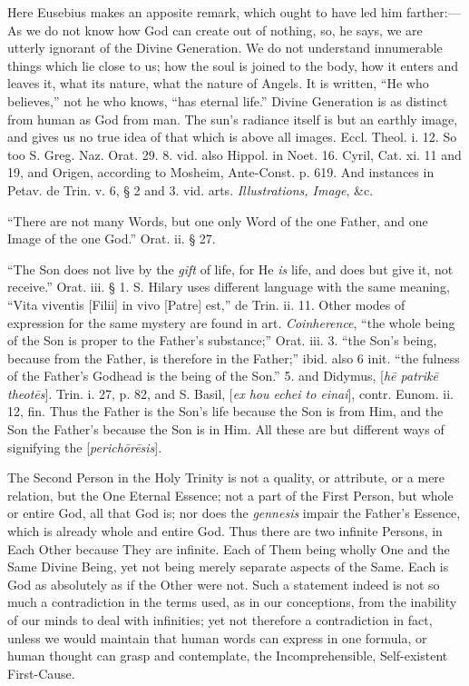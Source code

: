 Here Eusebius makes an apposite remark, which
ought to have led him farther:—As we do not know how God can create
out of nothing, so, he says, we are utterly ignorant of the Divine
Generation. We do not understand innumerable things which lie close to
us; how the soul is joined to the body, how it enters and leaves it,
what its nature, what the nature of Angels. It is written, ``He who
believes,'' not he who knows, ``has eternal life.'' Divine Generation is
as distinct from human as God from man. The sun's radiance itself is
but an earthly image, and gives us no true idea of that which is
above all images. Eccl. Theol. i. 12. So too S. Greg. Naz. Orat. 29.
8. vid. also Hippol. in Noet. 16. Cyril, Cat. xi. 11 and 19, and
Origen, according to Mosheim, Ante-Const. p. 619. And instances in
Petav. de Trin. v. 6, § 2 and 3. vid. arts. \emph{Illustrations, Image},
\&c.

``There are not many Words, but one only Word of
the one Father, and one Image of the one God.'' Orat. ii. § 27.

``The Son does not live by the \emph{gift} of
life, for He \emph{is} life, and does but give it, not receive.'' Orat.
iii. § 1. S. Hilary uses different language with the same meaning, ``Vita
viventis [Filii] in vivo [Patre] est,'' de Trin. ii. 11. Other modes of
expression for the same mystery are found in art. \emph{Coinherence}, ``the
whole being of the Son is proper to the Father's substance;'' Orat.
iii. 3. ``the Son's being, because from the Father, is therefore in the
Father;'' ibid. also 6 init. ``the fulness of the Father's Godhead is
the being of the Son.'' 5. and Didymus, [\emph{h\={e} patrik\={e}
theot\={e}s}]. Trin. i. 27, p. 82, and S. Basil, [\emph{ex hou
echei to einai}], contr. Eunom. ii. 12, fin. Thus the Father is the
Son's life because the Son is from Him, and the Son the Father's
because the Son is in Him. All these are but different ways of
signifying the [\emph{perich\={o}r\={e}sis}].

The Second Person in the Holy Trinity is not a
quality, or attribute, or a mere relation, but the One Eternal
Essence; not a part of the First Person, but whole or entire God, all
that God is; nor does the \emph{gennesis} impair the Father's Essence,
which is already whole and entire God. Thus there are two
infinite Persons, in Each Other because They are infinite. Each of
Them being wholly One and the Same Divine Being, yet not being merely
separate aspects of the Same. Each is God as absolutely as if the
Other were not. Such a statement indeed is not so much a contradiction
in the terms used, as in our conceptions, from the inability of our
minds to deal with infinities; yet not therefore a contradiction in
fact, unless we would maintain that human words can express in one
formula, or human thought can grasp and contemplate, the
Incomprehensible, Self-existent First-Cause.

